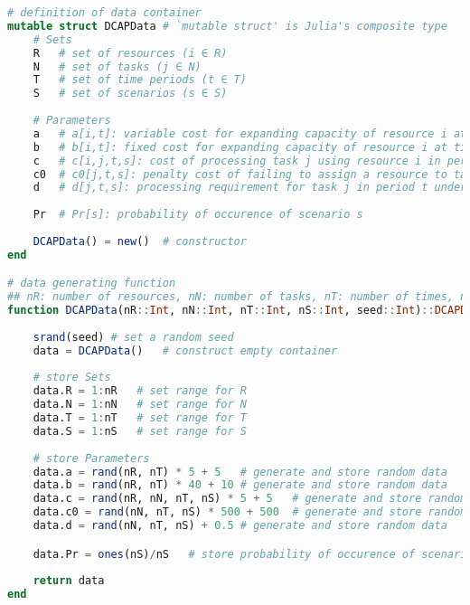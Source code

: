 \documentclass[11pt]{article}
\begin{document}
\begin{lstlisting}[frame=single,language=julia]
# definition of data container
mutable struct DCAPData	# `mutable struct' is Julia's composite type
	# Sets
	R   # set of resources (i ∈ R)
	N   # set of tasks (j ∈ N)
	T   # set of time periods (t ∈ T)
	S   # set of scenarios (s ∈ S)
	
	# Parameters
	a   # a[i,t]: variable cost for expanding capacity of resource i at time t
	b   # b[i,t]: fixed cost for expanding capacity of resource i at time t
	c   # c[i,j,t,s]: cost of processing task j using resource i in period t under scenario s
	c0  # c0[j,t,s]: penalty cost of failing to assign a resource to task j under scenario s
	d   # d[j,t,s]: processing requirement for task j in period t under scenario s
	
	Pr  # Pr[s]: probability of occurence of scenario s
	
	DCAPData() = new()	# constructor
end

# data generating function
## nR: number of resources, nN: number of tasks, nT: number of times, nS: number of scenarios, seed: random seed
function DCAPData(nR::Int, nN::Int, nT::Int, nS::Int, seed::Int)::DCAPData
	
	srand(seed)	# set a random seed
	data = DCAPData()	# construct empty container
	
	# store Sets
	data.R = 1:nR	# set range for R
	data.N = 1:nN	# set range for N
	data.T = 1:nT	# set range for T
	data.S = 1:nS	# set range for S
	
	# store Parameters
	data.a = rand(nR, nT) * 5 + 5	# generate and store random data
	data.b = rand(nR, nT) * 40 + 10	# generate and store random data
	data.c = rand(nR, nN, nT, nS) * 5 + 5	# generate and store random data
	data.c0 = rand(nN, nT, nS) * 500 + 500	# generate and store random data
	data.d = rand(nN, nT, nS) + 0.5	# generate and store random data

	data.Pr = ones(nS)/nS	# store probability of occurence of scenarios
	
	return data
end

\end{lstlisting}
\end{document}
